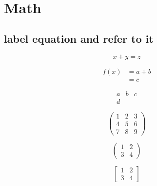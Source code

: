 \chapter{Math}

\section{label equation and refer to it}

\begin{equation}
    x+y=z
    \label{math_addition}
\end{equation}

\begin{align}
    \label{math_align}
    f(x) &= a+b\\
         &= c   
\end{align}

\begin{equation} %
    \begin{array}{ccc}
        a   &b   &c \\ %
        d
    \end{array}
\end{equation}

\begin{equation}
    \left(
        \begin{array}{cccc}
            1 & 2 & 3\\
            4 & 5 & 6\\
            7 & 8 & 9
        \end{array}
    \right)
\end{equation}

\begin{equation}
    \label{math_parenthesis_matrx}
    \begin{pmatrix}
        1 & 2\\
        3 & 4
    \end{pmatrix}
\end{equation}

\begin{equation}
    \begin{bmatrix}
        1 & 2\\
        3 & 4
    \end{bmatrix}
\end{equation}\label{math_bracket_matrix}

